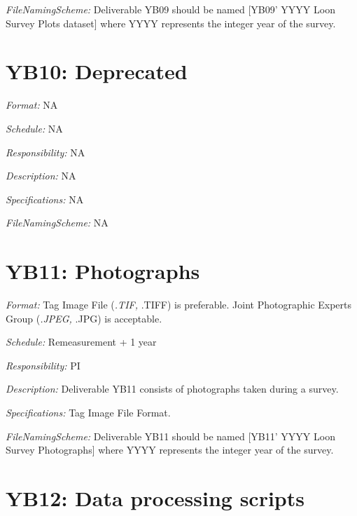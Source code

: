 \documentclass[
  letterpaper,
  DIV=11,
  numbers=noendperiod]{scrreprt}
\begin{document}
\emph{FileNamingScheme:} Deliverable YB09 should be named {[}YB09' YYYY
Loon Survey Plots dataset{]} where YYYY represents the integer year of
the survey.


\chapter*{YB10: Deprecated}\label{yb10-deprecated}


\emph{Format:} NA

\emph{Schedule:} NA

\emph{Responsibility:} NA

\emph{Description:} NA

\emph{Specifications:} NA

\emph{FileNamingScheme:} NA


\chapter*{YB11: Photographs}\label{yb11-photographs}


\emph{Format:} Tag Image File (\emph{.TIF, }.TIFF) is preferable. Joint
Photographic Experts Group (\emph{.JPEG, }.JPG) is acceptable.

\emph{Schedule:} Remeasurement + 1 year

\emph{Responsibility:} PI

\emph{Description:} Deliverable YB11 consists of photographs taken
during a survey.

\emph{Specifications:} Tag Image File Format.

\emph{FileNamingScheme:} Deliverable YB11 should be named {[}YB11' YYYY
Loon Survey Photographs{]} where YYYY represents the integer year of the
survey.


\chapter*{YB12: Data processing
scripts}\label{yb12-data-processing-scripts}
\end{document}
